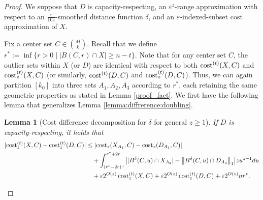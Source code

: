 \documentclass[11pt,letterpaper]{article}
\newtheorem{lemma}[theorem]{Lemma}
\theoremstyle{definition}
\newcommand{\eps}{\varepsilon}
\DeclarePairedDelimiter{\abs}{\lvert}{\rvert}
\DeclarePairedDelimiter{\norm}{\lVert}{\rVert}
\begin{document}
\begin{proof}
We suppose that $D$ is capacity-respecting, an $\eps^z$-range approximation with respect to an $\frac{\eps}{10z}$-smoothed distance function $\delta$, and an $\eps$-indexed-subset cost approximation of $X$. 
%

Fix a center set $C\in \binom{M}{k}$.
%
Recall that we define $r^\ast := \inf \{r>0\;\big|\; |B(C,r)\cap X|\geq n-t\}$. 
%
Note that for any center set \( C \), the outlier sets within \( X \) (or \( D \)) are identical with respect to both \(\cost^{(t)}(X,C)\) and \(\cost_z^{(t)}(X,C)\) (or similarly, \(\cost^{(t)}(D,C)\) and \(\cost_z^{(t)}(D,C)\)).
%
Thus, we can again partition \([k_0]\) into three sets \(A_1, A_2, A_3\) according to $r^\ast$, each retaining the same geometric properties as stated in Lemma \ref{proof_fact}.
%
We first have the following lemma that generalizes Lemma \ref{lemma:diffrerence:doubling}.

\begin{lemma}[Cost difference decomposition for $\delta$ for general $z\geq 1$]
\label{lemma:diffrerence:doubling_kzC}
If $D$ is capacity-respecting, it holds that 
\begin{equation*}
	\begin{aligned}
	    \abs{ \cost[t]_z(X,C)-\cost[t]_z(D,C) } &\leq \abs{ \cost_z(X_{A_1},C)-\cost_z(D_{A_1},C) } \\
	    &\quad + \int_{(r^\ast-2r)^+}^{r^\ast+2r} \abs*{ |B^\delta(C,u)\cap X_{A_3}|-\norm[\big]{B^\delta(C,u)\cap D_{A_3}}_1 } z u^{z-1} du \\
	    &\quad +\eps 2^{O(z)}\cost^{(t)}_z(X,C) +\eps 2^{O(z)}\cost[t]_z(D,C) + \eps 2^{O(z)} n r^z.
	\end{aligned}
\end{equation*}
\end{lemma}


\end{proof}
\end{document}

